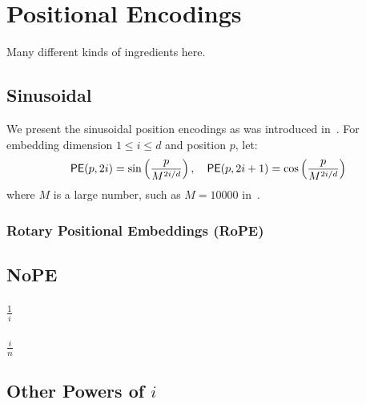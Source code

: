 %
\chapter{Positional Encodings}
%

Many different kinds of ingredients here.

\section{Sinusoidal}

We present the sinusoidal position encodings as was introduced in~\citep{vaswani-etal-2017-attention}.
For embedding dimension \(1 \leq i \leq d\) and position \(p\), let:
\begin{align*}
    \mathsf{PE}(p, 2i) = \sin\left(\frac{p}{M^{2i/d}}\right),
    \quad
    \mathsf{PE}(p, 2i+1) = \cos\left(\frac{p}{M^{2i/d}}\right)
\end{align*}
where \(M\) is a large number, such as \(M = 10000\) in~\citep{vaswani-etal-2017-attention}.

\subsection{Rotary Positional Embeddings (RoPE)}
\cite{su2024roformer}




\section{NoPE}

\subsection{$\frac{1}{i}$}


\subsection{$\frac{i}{n}$}

\section{Other Powers of $i$}

